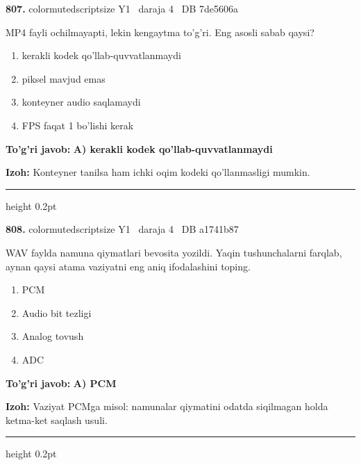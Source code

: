 \documentclass[10pt,a4paper,oneside]{article}
\begin{document}
\noindent\textbf{\color{ink}807.}  {color{muted}scriptsize Y1 \textbullet\ daraja 4 \textbullet\ DB 7de5606a}
\par
MP4 fayli ochilmayapti, lekin kengaytma to'g'ri. Eng asosli sabab qaysi?
\begin{enumerate}[label=\Alph*),leftmargin=9mm]
\item kerakli kodek qo'llab-quvvatlanmaydi
\item piksel mavjud emas
\item konteyner audio saqlamaydi
\item FPS faqat 1 bo'lishi kerak
\end{enumerate}
\begin{tcolorbox}[enhanced,breakable,colback=teal!4,colframe=teal!50!black,boxrule=0.5pt,arc=1.1mm,left=3mm,right=3mm,top=1.7mm,bottom=1.7mm,before skip=2mm,after skip=2mm]
\textbf{\color{teal}To'g'ri javob:} \textbf{A) kerakli kodek qo'llab-quvvatlanmaydi}
\par\smallskip
\textbf{Izoh:} Konteyner tanilsa ham ichki oqim kodeki qo'llanmasligi mumkin.
\end{tcolorbox}
\vspace{2mm}\hrule height 0.2pt \vspace{3mm}

\noindent\textbf{\color{ink}808.}  {color{muted}scriptsize Y1 \textbullet\ daraja 4 \textbullet\ DB a1741b87}
\par
WAV faylda namuna qiymatlari bevosita yozildi. Yaqin tushunchalarni farqlab, aynan qaysi atama vaziyatni eng aniq ifodalashini toping.
\begin{enumerate}[label=\Alph*),leftmargin=9mm]
\item PCM
\item Audio bit tezligi
\item Analog tovush
\item ADC
\end{enumerate}
\begin{tcolorbox}[enhanced,breakable,colback=teal!4,colframe=teal!50!black,boxrule=0.5pt,arc=1.1mm,left=3mm,right=3mm,top=1.7mm,bottom=1.7mm,before skip=2mm,after skip=2mm]
\textbf{\color{teal}To'g'ri javob:} \textbf{A) PCM}
\par\smallskip
\textbf{Izoh:} Vaziyat PCMga misol: namunalar qiymatini odatda siqilmagan holda ketma-ket saqlash usuli.
\end{tcolorbox}
\vspace{2mm}\hrule height 0.2pt \vspace{3mm}
\end{document}
